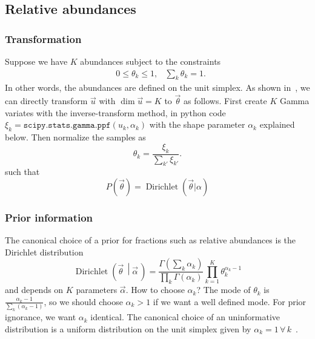 \documentclass[a4,12pt]{article}
\DeclareMathOperator{\Dirichlet}{Dirichlet}
\newcommand{\given}[2]{\left(#1\, \middle| #2 \, \right)}
\newcommand{\vecalpha}{\ensuremath{\vec{\alpha}}}
\newcommand{\vecth}{\ensuremath{{\vec{\theta}}}}
\newcommand{\vecu}{\ensuremath{{\vec{u}}}}
\begin{document}
\subsection{Relative abundances}

\subsubsection{Transformation}

Suppose we have $K$ abundances subject to the constraints
\begin{align}
  \label{eq:unit-simplex}
  & 0 \leq \theta_k \leq 1, & \sum_{k}\theta_k = 1.
\end{align}
In other words, the abundances are defined on the unit simplex.  As
shown in~\cite{betancourt_cruising_2012}, we can directly transform
$\vecu$ with $\dim \vecu = K$ to $\vecth$ as follows. First create $K$
Gamma variates with the inverse-transform method, in python code
$\xi_k = \texttt{scipy.stats.gamma.ppf}(u_k, \alpha_k)$ with the shape
parameter $\alpha_k$ explained below. Then normalize the samples as
\begin{equation}
  \label{eq:dirichlet-gamma}
  \theta_k = \frac{\xi_k}{\sum_{k'} \xi_{k'}}.
\end{equation}
such that
\begin{equation}
  \label{eq:dirichlet-prior}
  P(\vecth) = \Dirichlet(\vecth | \alpha)
\end{equation}

\subsubsection{Prior information}

The canonical choice of a prior for fractions such as relative
abundances is the Dirichlet
distribution~\cite[App.~B]{bishop_pattern_2006}
\begin{equation}
  \label{eq:dirichlet-def}
  \Dirichlet \given{\vecth}{\vecalpha} = \frac{\Gamma\left(\sum_k \alpha_k\right)}{\prod_k \Gamma(\alpha_k)} \prod_{k=1}^K \theta_k^{\alpha_k-1}
\end{equation}
and depends on $K$ parameters $\vecalpha$. How to choose $\alpha_k$?
The mode of $\theta_k$ is $\frac{\alpha_k - 1}{\sum_k (\alpha_k -
  1)}$, so we should choose $\alpha_k > 1$ if we want a well defined
mode. For prior ignorance, we want $\alpha_k$ identical. The canonical
choice of an uninformative distribution is a uniform distribution on
the unit simplex given by $\alpha_k=1 \, \forall \,
k$~\cite{tuyl_posterior_2009}.
\end{document}
